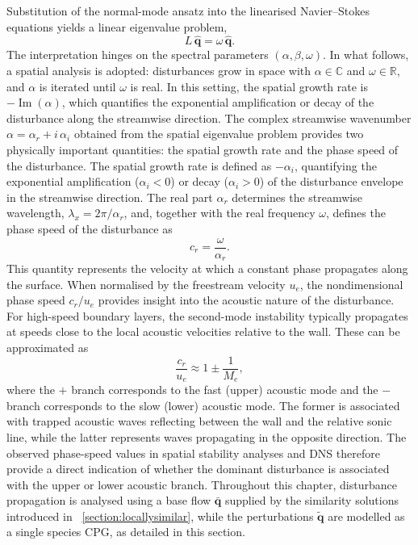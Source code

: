 Substitution of the normal-mode ansatz into the linearised Navier--Stokes equations yields a linear eigenvalue problem,
\begin{equation*}
  L\,\hat{\boldsymbol{q}} = \omega\,\hat{\boldsymbol{q}}.
\end{equation*}
The interpretation hinges on the spectral parameters \((\alpha,\beta,\omega)\). In what follows, a spatial analysis is adopted: disturbances grow in space with \(\alpha \in \mathbb{C}\) and \(\omega \in \mathbb{R}\), and \(\alpha\) is iterated until \(\omega\) is real. In this setting, the spatial growth rate is \(-\operatorname{Im}(\alpha)\), which quantifies the exponential amplification or decay of the disturbance along the streamwise direction. The complex streamwise wavenumber \(\alpha = \alpha_r + i\,\alpha_i\) obtained from the spatial eigenvalue problem provides two physically important quantities: the spatial growth rate and the phase speed of the disturbance. The spatial growth rate is defined as \(-\alpha_i\), quantifying the exponential amplification (\(\alpha_i < 0\)) or decay (\(\alpha_i > 0\)) of the disturbance envelope in the streamwise direction. The real part \(\alpha_r\) determines the streamwise wavelength, \(\lambda_x = 2\pi / \alpha_r\), and, together with the real frequency \(\omega\), defines the phase speed of the disturbance as
\[
  c_r = \frac{\omega}{\alpha_r}.
\]
This quantity represents the velocity at which a constant phase propagates along the surface. When normalised by the freestream velocity \(u_e\), the nondimensional phase speed \(c_r/u_e\) provides insight into the acoustic nature of the disturbance. For high-speed boundary layers, the second-mode instability typically propagates at speeds close to the local acoustic velocities relative to the wall. These can be approximated as
\[
  \frac{c_r}{u_e} \approx 1 \pm \frac{1}{M_e},
\]
where the \(+\) branch corresponds to the fast (upper) acoustic mode and the \(-\) branch corresponds to the slow (lower) acoustic mode. The former is associated with trapped acoustic waves reflecting between the wall and the relative sonic line, while the latter represents waves propagating in the opposite direction. The observed phase-speed values in spatial stability analyses and DNS therefore provide a direct indication of whether the dominant disturbance is associated with the upper or lower acoustic branch. Throughout this chapter, disturbance propagation is analysed using a base flow \(\bar{\boldsymbol{q}}\) supplied by the similarity solutions introduced in ~\cref{section:locallysimilar}, while the perturbations \(\tilde{\boldsymbol{q}}\) are modelled as a single species \gls{CPG}, as detailed in this section.


